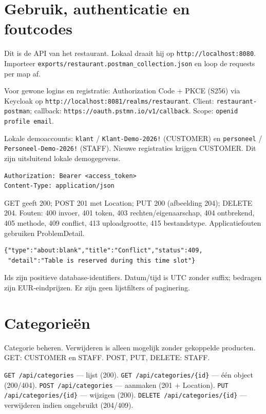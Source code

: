 \documentclass[11pt]{article}
\begin{document}

\section{Gebruik, authenticatie en foutcodes}
Dit is de API van het restaurant. Lokaal draait hij op
\texttt{http://localhost:8080}. Importeer
\texttt{exports/restaurant.postman\_collection.json} en loop de requests per map
af.

Voor gewone logins en registratie: Authorization Code + PKCE (S256) via Keycloak
op \texttt{http://localhost:8081/realms/restaurant}. Client:
\texttt{restaurant-postman}; callback:
\texttt{https://oauth.pstmn.io/v1/callback}. Scope: \texttt{openid profile email}.

Lokale demoaccounts: \texttt{klant} / \texttt{Klant-Demo-2026!} (CUSTOMER) en
\texttt{personeel} / \texttt{Personeel-Demo-2026!} (STAFF). Nieuwe registraties
krijgen CUSTOMER. Dit zijn uitsluitend lokale demogegevens.

\begin{lstlisting}
Authorization: Bearer <access_token>
Content-Type: application/json
\end{lstlisting}

GET geeft 200; POST 201 met Location; PUT 200 (afbeelding 204); DELETE 204.
Fouten: 400 invoer, 401 token, 403 rechten/eigenaarschap, 404 ontbrekend, 405
methode, 409 conflict, 413 uploadgrootte, 415 bestandstype. Applicatiefouten
gebruiken ProblemDetail.

\begin{lstlisting}
{"type":"about:blank","title":"Conflict","status":409,
 "detail":"Table is reserved during this time slot"}
\end{lstlisting}

Ids zijn positieve database-identifiers. Datum/tijd is UTC zonder suffix;
bedragen zijn EUR-eindprijzen. Er zijn geen lijstfilters of paginering.

\section{Categorieën}
Categorie beheren. Verwijderen is alleen mogelijk zonder gekoppelde producten.
GET: CUSTOMER en STAFF. POST, PUT, DELETE: STAFF.

\texttt{GET /api/categories} --- lijst (200).
\texttt{GET /api/categories/\{id\}} --- één object (200/404).
\texttt{POST /api/categories} --- aanmaken (201 + Location).
\texttt{PUT /api/categories/\{id\}} --- wijzigen (200).
\texttt{DELETE /api/categories/\{id\}} --- verwijderen indien ongebruikt (204/409).
\end{document}
